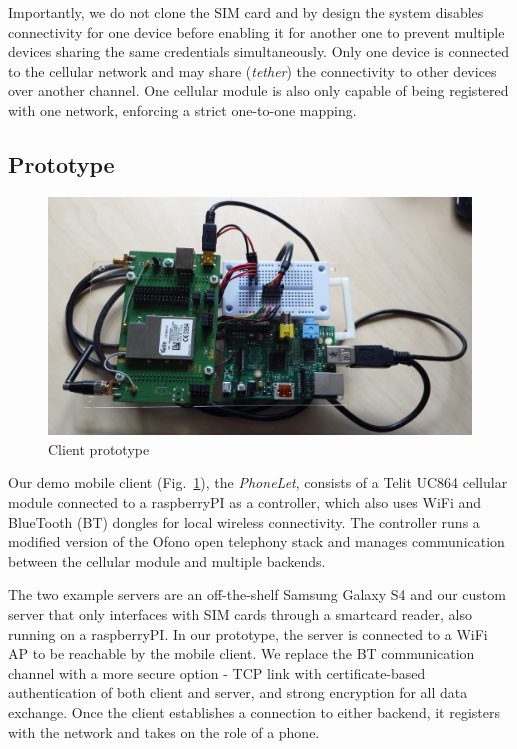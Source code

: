 \documentclass{sig-alternate-2013}
\begin{document}
Importantly, we do not clone the SIM card and by design the system disables connectivity for one device before enabling it for another one to prevent multiple devices sharing the same credentials simultaneously. Only one device is connected to the cellular network and may share (\emph{tether}) the connectivity to other devices over another channel. One cellular module is also only capable of being registered with one network, enforcing a strict one-to-one mapping.

\subsection{Prototype}

\begin{figure}[t!]
\centering
\includegraphics[width=\columnwidth]{figs/client}
\caption{Client prototype}
\label{fig:client}
\end{figure}

Our demo mobile client (Fig.~\ref{fig:client}), the \emph{PhoneLet}, consists of a Telit UC864 cellular module connected to a raspberryPI as a controller, which also uses WiFi and BlueTooth (BT) dongles for local wireless connectivity. The controller runs a modified version of the Ofono open telephony stack and manages communication between the cellular module and multiple backends.

The two example servers are an off-the-shelf Samsung Galaxy S4 and our custom server that only interfaces with SIM cards through a smartcard reader, also running on a raspberryPI. In our prototype, the server is connected to a WiFi AP to be reachable by the mobile client. We replace the BT communication channel with a more secure option - TCP link with certificate-based authentication of both client and server, and strong encryption for all data exchange. Once the client establishes a connection to either backend, it registers with the network and takes on the role of a phone.
\end{document}
